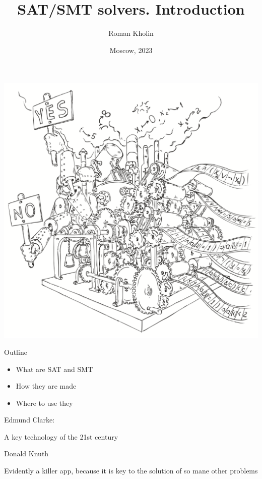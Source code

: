 \documentclass[mathserif]{beamer}
\begin{document}
\title{SAT/SMT solvers. Introduction}
\author{Roman Kholin}
\date{Moscow, 2023}

\begin{frame}
\includegraphics[scale=0.5]{../decision-procedure.png}
\end{frame}

\frame{\titlepage}

\begin{frame}{Outline}
\begin{itemize}
\item What are SAT and SMT
\item How they are made
\item Where to use they
\end{itemize}
\end{frame}

\begin{frame}
Edmund Clarke:
\begin{block}{}
A key technology of the 21st century
\end{block}
Donald Knuth
\begin{block}{}
Evidently a killer app, because it is key to the solution of so mane other problems
\end{block}
\end{frame}
\end{document}
